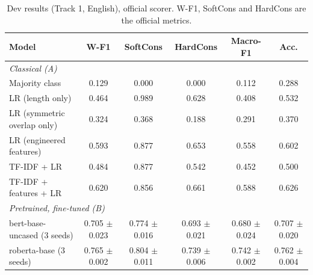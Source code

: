\begin{table}[t]
\centering
\small
\begin{tabular}{lccccc}
\toprule
Model & W-F1 & SoftCons & HardCons & Macro-F1 & Acc. \\
\midrule
\multicolumn{6}{l}{\textit{Classical (A)}} \\
Majority class & 0.129 & 0.000 & 0.000 & 0.112 & 0.288 \\
LR (length only) & 0.464 & 0.989 & 0.628 & 0.408 & 0.532 \\
LR (symmetric overlap only) & 0.324 & 0.368 & 0.188 & 0.291 & 0.370 \\
LR (engineered features) & 0.593 & 0.877 & 0.653 & 0.558 & 0.602 \\
TF-IDF + LR & 0.484 & 0.877 & 0.542 & 0.452 & 0.500 \\
TF-IDF + features + LR & 0.620 & 0.856 & 0.661 & 0.588 & 0.626 \\
\multicolumn{6}{l}{\textit{Pretrained, fine-tuned (B)}} \\
bert-base-uncased (3 seeds) & 0.705 $\pm$ 0.023 & 0.774 $\pm$ 0.016 & 0.693 $\pm$ 0.021 & 0.680 $\pm$ 0.024 & 0.707 $\pm$ 0.020 \\
roberta-base (3 seeds) & 0.765 $\pm$ 0.002 & 0.804 $\pm$ 0.011 & 0.739 $\pm$ 0.006 & 0.742 $\pm$ 0.002 & 0.762 $\pm$ 0.004 \\
\bottomrule
\end{tabular}
\caption{Dev results (Track 1, English), official scorer. W-F1, SoftCons and HardCons are the official metrics.}
\label{tab:results}
\end{table}

